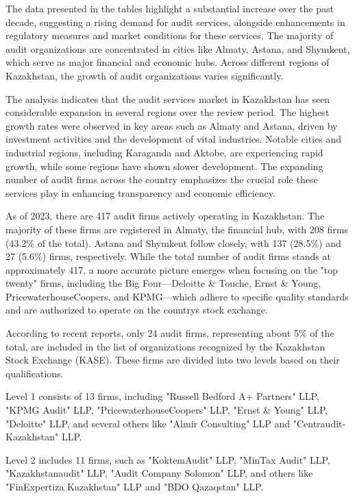 \begin{multicols}{2}

The data presented in the tables highlight a substantial increase over
the past decade, suggesting a rising demand for audit services,
alongside enhancements in regulatory measures and market conditions for
these services. The majority of audit organizations are concentrated in
cities like Almaty, Astana, and Shymkent, which serve as major financial
and economic hubs. Across different regions of Kazakhstan, the growth of
audit organizations varies significantly.

The analysis indicates that the audit services market in Kazakhstan has
seen considerable expansion in several regions over the review period.
The highest growth rates were observed in key areas such as Almaty and
Astana, driven by investment activities and the development of vital
industries. Notable cities and industrial regions, including Karaganda
and Aktobe, are experiencing rapid growth, while some regions have shown
slower development. The expanding number of audit firms across the
country emphasizes the crucial role these services play in enhancing
transparency and economic efficiency.

As of 2023, there are 417 audit firms actively operating in Kazakhstan.
The majority of these firms are registered in Almaty, the financial hub,
with 208 firms (43.2\% of the total). Astana and Shymkent follow
closely, with 137 (28.5\%) and 27 (5.6\%) firms, respectively. While the
total number of audit firms stands at approximately 417, a more accurate
picture emerges when focusing on the "top twenty" firms, including the
Big Four---Deloitte \& Touche, Ernst \& Young, PricewaterhouseCoopers,
and KPMG---which adhere to specific quality standards and are authorized
to operate on the country\textquotesingle s stock exchange.

According to recent reports, only 24 audit firms, representing about 5\%
of the total, are included in the list of organizations recognized by
the Kazakhstan Stock Exchange (KASE). These firms are divided into two
levels based on their qualifications.

Level 1 consists of 13 firms, including "Russell Bedford A+ Partners"
LLP, "KPMG Audit" LLP, "PricewaterhouseCoopers" LLP, "Ernst \& Young"
LLP, "Deloitte" LLP, and several others like "Almir Consulting" LLP and
"Centraudit-Kazakhstan" LLP.

Level 2 includes 11 firms, such as "KoktemAudit" LLP, "MinTax Audit"
LLP, "Kazakhstanaudit" LLP, "Audit Company Solomon" LLP, and others like
"FinExpertiza Kazakhstan" LLP and "BDO Qazaqstan" LLP.


\end{multicols}
